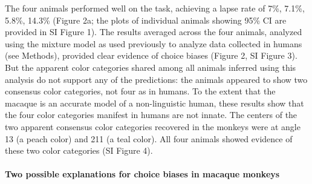 The four animals performed well on the task, achieving a lapse rate of 7\%, 7.1\%, 5.8\%, 14.3\% (Figure 2a; the plots of individual animals showing 95\% CI are provided in SI Figure 1). The results averaged across the four animals, analyzed using the mixture model as used previously to analyze data collected in humans \citep{bae_why_2015,zhang_discrete_2008} (see Methods), provided clear evidence of choice biases (Figure 2, SI Figure 3). But the apparent color categories shared among all animals inferred using this analysis do not support any of the predictions: the animals appeared to show two consensus color categories, not four as in humans. To the extent that the macaque is an accurate model of a non-linguistic human, these results show that the four color categories manifest in humans are not innate. The centers of the two apparent consensus color categories recovered in the monkeys were at angle 13 (a peach color) and 211 (a teal color). All four animals showed evidence of these two color categories (SI Figure 4).

\paragraph{Two possible explanations for choice biases in macaque monkeys}

